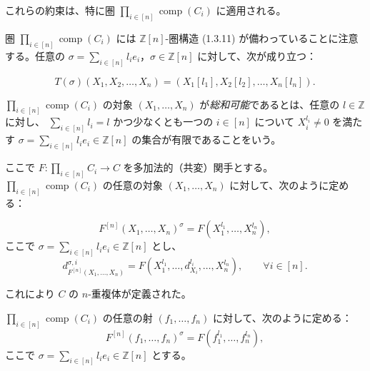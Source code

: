 \clearpage
{}%
これらの約束は、特に圏
$\prod_{i\in[n]}\operatorname{comp}(C_i)$ に適用される。

圏 $\prod_{i\in[n]}\operatorname{comp}(C_i)$ には
$\mathbb Z[n]$-圏構造 (1.3.11) が備わっていることに注意する。任意の
$\sigma=\sum_{i\in[n]}l_i e_i$，$\sigma\in\mathbb Z[n]$ に対して、次が成り立つ：

\begin{equation}
  T(\sigma)(X_1,X_2,\ldots,X_n)
  = (X_1[l_1],X_2[l_2],\ldots,X_n[l_n]).
  \tag{2.4.2.1}
\end{equation}

$\prod_{i\in[n]}\operatorname{comp}(C_i)$ の対象
$(X_1,\ldots,X_n)$ が\emph{総和可能}であるとは、任意の
$l\in\mathbb Z$ に対し、
$\sum_{i\in[n]}l_i=l$ かつ少なくとも一つの $i\in[n]$ について
$X_i^{l_i}\neq0$ を満たす
$\sigma=\sum_{i\in[n]}l_i e_i\in\mathbb Z[n]$ の集合が有限であることをいう。

ここで
$F\colon\prod_{i\in[n]}C_i\longrightarrow C$ を多加法的（共変）関手とする。
$\prod_{i\in[n]}\operatorname{comp}(C_i)$ の任意の対象
$(X_1,\ldots,X_n)$ に対して、次のように定める：

\begin{equation}
  F^{[n]}(X_1,\ldots,X_n)^\sigma
  =F(X_1^{l_1},\ldots,X_n^{l_n}),
  \tag{2.4.2.2}
\end{equation}
ここで $\sigma=\sum_{i\in[n]}l_i e_i\in\mathbb Z[n]$ とし、
\begin{equation*}
  d^{\sigma,i}_{F^{[n]}(X_1,\ldots,X_n)}
  =F(X_1^{l_1},\ldots,d_{X_i}^{l_i},\ldots,X_n^{l_n}),
  \qquad \forall i\in[n].
\end{equation*}

これにより $C$ の $n$-重複体が定義された。

$\prod_{i\in[n]}\operatorname{comp}(C_i)$ の任意の射
$(f_1,\ldots,f_n)$ に対して、次のように定める：
\begin{equation}
  F^{[n]}(f_1,\ldots,f_n)^\sigma
  =F(f_1^{l_1},\ldots,f_n^{l_n}),
  \tag{2.4.2.3}
\end{equation}
ここで $\sigma=\sum_{i\in[n]}l_i e_i\in\mathbb Z[n]$ とする。

